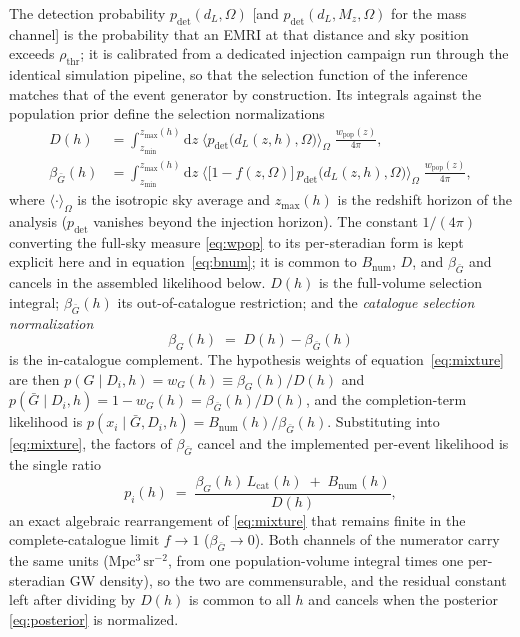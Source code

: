 The detection probability $p_\mathrm{det}(d_L, \Omega)$ [and
$p_\mathrm{det}(d_L, M_z, \Omega)$ for the mass channel] is the
probability that an EMRI at that distance and sky position exceeds
$\rho_\mathrm{thr}$; it is calibrated from a dedicated injection
campaign run through the identical simulation pipeline, so that the
selection function of the inference matches that of the event
generator by construction.  Its integrals against the population
prior define the selection normalizations
\begin{align}
  D(h) &= \int_{z_\mathrm{min}}^{z_\mathrm{max}(h)} \mathrm{d}z\;
  \Big\langle p_\mathrm{det}\big(d_L(z,h), \Omega\big)
  \Big\rangle_{\Omega}\;
  \frac{w_\mathrm{pop}(z)}{4\pi},
  \label{eq:Dh}\\
  \beta_{\bar G}(h) &= \int_{z_\mathrm{min}}^{z_\mathrm{max}(h)} \mathrm{d}z\;
  \Big\langle \big[1 - f(z,\Omega)\big]\,
  p_\mathrm{det}\big(d_L(z,h), \Omega\big) \Big\rangle_{\Omega}\;
  \frac{w_\mathrm{pop}(z)}{4\pi},
  \label{eq:betabar}
\end{align}
where $\langle\cdot\rangle_\Omega$ is the isotropic sky average and
$z_\mathrm{max}(h)$ is the redshift horizon of the analysis
($p_\mathrm{det}$ vanishes beyond the injection horizon).  The
constant $1/(4\pi)$ converting the full-sky measure \eqref{eq:wpop} to
its per-steradian form is kept explicit here and in
equation~\eqref{eq:bnum}; it is common to $B_\mathrm{num}$, $D$, and
$\beta_{\bar G}$ and cancels in the assembled likelihood below.
$D(h)$ is
the full-volume selection integral; $\beta_{\bar G}(h)$ its
out-of-catalogue restriction; and the \emph{catalogue selection
normalization}
\begin{equation}
  \beta_G(h) \;=\; D(h) - \beta_{\bar G}(h)
  \label{eq:betag}
\end{equation}
is the in-catalogue complement.  The hypothesis weights of
equation~\eqref{eq:mixture} are then
$p(G \mid D_i, h) = w_G(h) \equiv \beta_G(h)/D(h)$ and
$p(\bar G \mid D_i, h) = 1 - w_G(h) = \beta_{\bar G}(h)/D(h)$, and the
completion-term likelihood is
$p(x_i \mid \bar G, D_i, h) = B_\mathrm{num}(h)/\beta_{\bar G}(h)$.
Substituting into \eqref{eq:mixture}, the factors of
$\beta_{\bar G}$ cancel and the implemented per-event likelihood is
the single ratio
\begin{equation}
  p_i(h) \;=\;
  \frac{\beta_G(h)\, L_\mathrm{cat}(h) \;+\; B_\mathrm{num}(h)}{D(h)},
  \label{eq:assembled}
\end{equation}
an exact algebraic rearrangement of \eqref{eq:mixture} that remains
finite in the complete-catalogue limit $f \to 1$
($\beta_{\bar G} \to 0$).  Both channels of the numerator carry the
same units ($\mathrm{Mpc^3\,sr^{-2}}$, from one population-volume
integral times one per-steradian GW density), so the two are
commensurable, and the residual constant left after dividing by
$D(h)$ is common to all $h$ and cancels when the posterior
\eqref{eq:posterior} is normalized.

